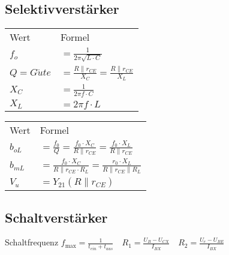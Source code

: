 \subsection{Selektivverstärker} %
    \begin{minipage}{0.45\columnwidth}
        \renewcommand{\arraystretch}{1.05}
        \begin{table}[H]
            \begin{tabularx}{\columnwidth}{l l}
                Wert            & Formel \\
                $f_o$           & $=\frac{1}{2\pi\sqrt{L\cdot C}}$ \\
                $Q=G\ddot{u}te$ & $=\frac{R\parallel r_{CE}}{X_C}=\frac{R\parallel r_{CE}}{X_L}$ \\
                $X_C$           & $=\frac{1}{2\pi f\cdot C}$ \\
                $X_L$           & $=2\pi f\cdot L$ \\
            \end{tabularx}
        \end{table}
    \end{minipage}
    \begin{minipage}{0.45\columnwidth}
        \renewcommand{\arraystretch}{1.05}
        \begin{table}[H]
            \begin{tabularx}{\columnwidth}{l l}
                Wert        & Formel \\
                $b_{oL}$    & $=\frac{f_0}{Q}=\frac{f_0\cdot X_C}{R\parallel r_{CE}}=\frac{f_0\cdot X_L}{R\parallel r_{CE}}$ \\
                $b_{mL}$    & $=\frac{f_0\cdot X_C}{R\parallel r_{CE}\cdot R_L}=\frac{r_0\cdot X_L}{R\parallel r_{CE}\parallel R_L}$ \\
                $V_u$       & $=Y_{21}(R\parallel r_{CE})$ \\
            \end{tabularx}
        \end{table}
    \end{minipage}
\subsection{Schaltverstärker}
    Schaltfrequenz $f_{\max}=\frac{1}{t_{ein}+t_{aus}}\quad R_1=\frac{U_B-U_{CX}}{I_{BX}}\quad R_2=\frac{U_e-U_{BE}}{I_{BX}}$
